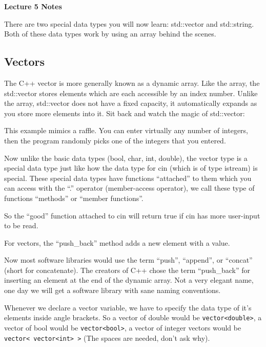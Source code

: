 \documentclass[a4paper,12pt]{article}
\begin{document}
\lstset{frame=single,tabsize=4,basicstyle=\ttfamily}

{\centering \bf \Large
Lecture 5 Notes \\[\baselineskip]
}

There are two special data types you will now learn: std::vector and std::string. Both of these data types work by using an array behind the scenes. 

\subsection*{Vectors}

The C++ vector is more generally known as a dynamic array. Like the array, the std::vector stores elements which are each accessible by an index number. Unlike the array, std::vector does not have a fixed capacity, it automatically expands as you store more elements into it. Sit back and watch the magic of std::vector:



This example mimics a raffle. You can enter virtually any number of integers, then the program randomly picks one of the integers that you entered.

Now unlike the basic data types (bool, char, int, double), the vector type is a special data type just like how the data type for cin (which is of type istream) is special. These special data types have functions ``attached'' to them which you can access with the ``.'' operator (member-access operator), we call these type of functions ``methods'' or ``member functions''.

So the ``good'' function attached to cin will return true if cin has more user-input to be read.

For vectors, the ``push\_back'' method adds a new element with a value.

Now most software libraries would use the term ``push'', ``append'', or ``concat'' (short for concatenate). The creators of C++ chose the term ``push\_back'' for inserting an element at the end of the dynamic array. Not a very elegant name, one day we will get a software library with sane naming conventions.

Whenever we declare a vector variable, we have to specify the data type of it's elements inside angle brackets. So a vector of double would be \texttt{vector<double>}, a vector of bool would be \texttt{vector<bool>}, a vector of integer vectors would be \texttt{vector< vector<int> >} (The spaces are needed, don't ask why).
\end{document}
